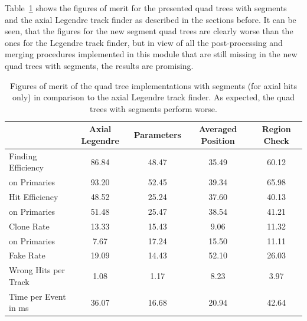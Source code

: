 Table~\ref{tab-quad-tree-segments} shows the figures of merit for the presented quad trees with segments and the axial Legendre track finder as described in the sections before. It can be seen, that the figures for the new segment quad trees are clearly worse than the ones for the Legendre track finder, but in view of all the post-processing and merging procedures implemented in this module that are still missing in the new quad trees with segments, the results are promising.

\begin{table}
  \caption{Figures of merit of the quad tree implementations with segments (for axial hits only) in comparison to the axial Legendre track finder. As expected, the quad trees with segments perform worse.}
  \begin{tabular}{lcccc} \toprule
    & Axial Legendre & Parameters & Averaged Position & Region Check \\ \midrule
    Finding Efficiency   & 86.84 & 48.47 & 35.49 & 60.12 \\
    \quad on Primaries   & 93.20 & 52.45 & 39.34 & 65.98 \\ 
    Hit Efficiency       & 48.52 & 25.24 & 37.60 & 40.13 \\
    \quad on Primaries   & 51.48 & 25.47 & 38.54 & 41.21 \\ 
    Clone Rate           & 13.33 & 15.43 & 9.06  & 11.32 \\
    \quad on Primaries   & 7.67  & 17.24 & 15.50 & 11.11 \\ 
    Fake Rate            & 19.09 & 14.43 & 52.10 & 26.03 \\ 
    Wrong Hits per Track & 1.08  & 1.17  & 8.23  & 3.97 \\ 
    Time per Event in ms & 36.07 & 16.68 & 20.94 & 42.64\footnotemark \\ \bottomrule
  \end{tabular}
  \label{tab-quad-tree-segments}
\end{table}


